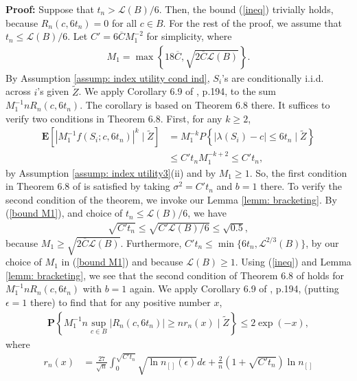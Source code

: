 \documentclass[12pt, fullpage]{amsart}
\theoremstyle{definition}
\theoremstyle{definition}
\theoremstyle{definition}
\begin{document}
\begin{bibunit}[econometrica]
\noindent \textbf{Proof: } Suppose that $t_n > \mathcal{L}(B)/6$. Then, the bound (\ref{ineq}) trivially holds, because $R_n(c,6t_n) = 0$ for all $c \in B$. For the rest of the proof, we assume that $t_n \le \mathcal{L}(B)/6$. Let $C' = 6 \overline C M_1^{-2} $ for simplicity, where 
\begin{align}
	\label{bound M1}
	M_1 = \max \left\{ 18 \overline C, \sqrt{2 \overline C \mathcal{L}(B)} \right\}.
\end{align}
By Assumption \ref{assump: index utility cond ind}, $S_i$'s are conditionally i.i.d. across $i$'s given $\tilde Z$. We apply Corollary 6.9 of \cite{Massart:07:ConcentrationInequality}, p.194, to the sum $M_1^{-1} n R_n(c,6t_n)$. The corollary is based on Theorem 6.8 there. It suffices to verify two conditions in Theorem 6.8. First, for any $k \ge 2$,
\begin{align*}
	\mathbf{E}\left[ \left|M_1^{-1} f(S_i;c, 6 t_n)\right|^k \mid \tilde Z \right] &= M_1^{-k} P\left\{ |\lambda(S_i) - c| \le 6 t_n \mid \tilde Z\right\} \\
	&\le C' t_n M_1^{-k+2} \le C' t_n,
\end{align*}
by Assumption \ref{assump: index utility3}(ii) and by $M_1 \ge 1$. So, the first condition in Theorem 6.8 of \cite{Massart:07:ConcentrationInequality} is satisfied by taking $\sigma^2=C't_n$ and $b=1$ there. To verify the second condition of the theorem, we invoke our Lemma \ref{lemm: bracketing}. By (\ref{bound M1}), and choice of $t_n \le \mathcal{L}(B)/6$, we have
\begin{align}
	\label{bound M2}
	\sqrt{C't_n} \le \sqrt{C'\mathcal{L}(B)/6} \le \sqrt{0.5},
\end{align}
because $M_1 \ge \sqrt{2 \overline C \mathcal{L}(B)}$. Furthermore, $C' t_n \le \min\{6 t_n, \mathcal{L}^{2/3}(B)\}$, by our choice of $M_1$ in (\ref{bound M1}) and because $\mathcal{L}(B) \ge 1$. Using (\ref{ineq}) and Lemma \ref{lemm: bracketing}, we see that the second condition of Theorem 6.8 of \cite{Massart:07:ConcentrationInequality} holds for $M_1^{-1} n R_n(c,6t_n)$ with $b=1$ again. We apply Corollary 6.9 of \cite{Massart:07:ConcentrationInequality}, p.194, (putting $\epsilon = 1$ there) to find that for any positive number $x$,
\begin{align*}
	\mathbf{P}\left\{ M_1^{-1} n \sup_{c \in B} |R_n(c,6t_n)| \ge n r_n(x) \mid \tilde Z \right\} \le 2 \exp( - x),
\end{align*}
where 
\begin{align}
	\label{bound14}
	r_n(x) &= \frac{27}{\sqrt{n}} \int_0^{\sqrt{ C' t_n}} \sqrt{ \ln n_{[]}(\epsilon) } d\epsilon + \frac{2}{n}\left(1 + \sqrt{C' t_n}\right)  \ln n_{[]}

\end{align}
\end{bibunit}
\end{document}
